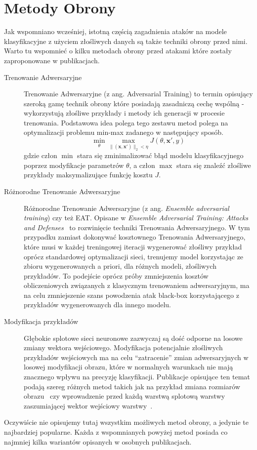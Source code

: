 \documentclass[
    left=2.5cm,         %
    right=2.5cm,        %
    top=2.5cm,          %
    bottom=3cm,         %
    bindingoffset=6mm,  %
    nohyphenation=false %
]{eiti/eiti-thesis}
\renewcommand{\vec}[1]{\mathbf{#1}}
\begin{document}
\section{Metody Obrony}\label{secition:metody_obrony}
Jak wspomniano wcześniej, istotną częścią zagadnienia ataków na modele klasyfikacyjne z użyciem złośliwych danych są
także techniki obrony przed nimi. Warto tu wspomnieć o kilku metodach obrony przed atakami które zostały
zaproponowane w publikacjach.
\begin{description}
    \item[Trenowanie Adwersaryjne]
    Trenowanie Adwersaryjne (z ang. Adversarial Training)\cite{DBLP:journals/corr/abs-1712-07107} to termin opisujący szeroką gamę technik obrony które posiadają
    zasadniczą cechę wspólną - wykorzystują złośliwe przykłady i metody ich generacji w procesie trenowania.
    Podstawowa idea polega tego zestawu metod polega na optymalizacji problemu min-max zadanego w następujący sposób.
    \begin{equation}
        \min _{\theta} \max _{\|(\vec{x}, \vec{x'})\|_2<\eta} J(\theta, \vec{x'}, y)
    \end{equation}
    gdzie człon $\min$ stara się zminimalizować błąd modelu klasyfikacyjnego poprzez modyfikacje parametrów $\theta$, a człon $\max$ stara się znaleźć
    złośliwe przykłady maksymalizujące funkcję kosztu $J$.
    \item[Różnorodne Trenowanie Adwersaryjne]
        Różnorodne Trenowanie Adwersaryjne (z ang. \textit{Ensemble adversarial training}) czy też EAT. Opisane w \textit{Ensemble Adversarial Training: Attacks and Defenses}~\cite{Tramr2018EnsembleAT} to rozwinięcie
        techniki Trenowania Adwersaryjnego. W tym przypadku zamiast dokonywać kosztownego Trenowania Adwersaryjnego,
        które musi w każdej treningowej iteracji wygenerować złośliwy przykład oprócz standardowej optymalizacji sieci,
        trenujemy model korzystając ze zbioru wygenerowanych a priori, dla różnych modeli, złośliwych przykładów.
        To podejście oprócz próby zmniejszenia kosztów obliczeniowych związanych z klasycznym trenowaniem adwersaryjnym, ma na celu
        zmniejszenie szans powodzenia atak black-box korzystającego z przykładów wygenerowanych dla innego modelu.
    \item[Modyfikacja przykładów]
        Głębokie splotowe sieci neuronowe zazwyczaj są dość odporne na losowe zmiany wektora wejściowego.
        Modyfikacja potencjalnie złośliwych przykładów wejściowych ma na celu ``zatracenie'' zmian adwersaryjnych w losowej modyfikacji obrazu,
        które w normalnych warunkach nie mają znacznego wpływu na precyzję klasyfikacji.
        Publikacje opisujące ten temat podają szereg różnych metod takich jak na przykład zmiana rozmiarów obrazu~\cite{DBLP:journals/corr/abs-1711-01991} czy
        wprowadzenie przed każdą warstwą splotową warstwy zaszumiającej wektor wejściowy warstwy~\cite{DBLP:journals/corr/abs-1712-00673}.
\end{description}
Oczywiście nie opisujemy tutaj wszystkim możliwych metod obrony, a jedynie te najbardziej popularne. Każda z wspomnianych powyżej metod posiada co najmniej kilka
wariantów opisanych w osobnych publikacjach.
\newpage
\end{document}
